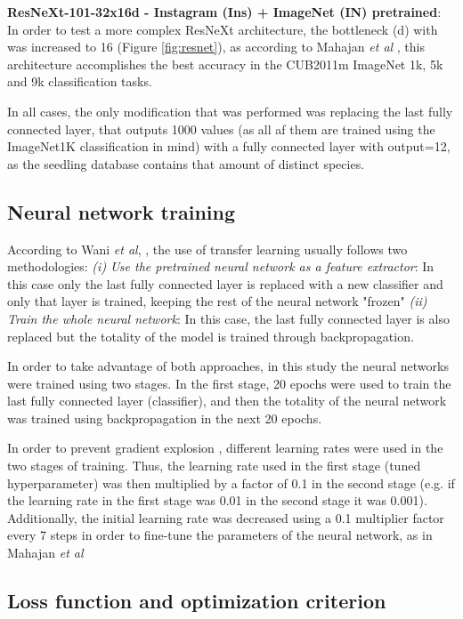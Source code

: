 \documentclass[10pt,onecolumn,titlepage,letterpaper]{article}
\begin{document}
\textbf{ResNeXt-101-32x16d - Instagram (Ins) + ImageNet (IN) pretrained}: In order to test a more complex ResNeXt architecture, the bottleneck (d) with was increased to 16 (Figure \ref{fig:resnet}), as according to Mahajan \textit{et al} \cite{Mahajan2018}, this architecture accomplishes the best accuracy in the CUB2011m ImageNet 1k, 5k and 9k classification tasks.

In all cases, the only modification that was performed was replacing the last fully connected layer, that outputs 1000 values (as all af them are trained using the ImageNet1K classification in mind) with a fully connected layer with output=12, as the seedling database contains that amount of distinct species.

\subsection{Neural network training}

According to Wani \textit{et al}, \cite{Wani2019}, the use of transfer learning usually follows two methodologies:  \textit{(i) Use the pretrained neural network as a feature extractor}: In this case only the last fully connected layer is replaced with a new classifier and only that layer is trained, keeping the rest of the neural network "frozen" \textit{(ii) Train the whole neural network}: In this case, the last fully connected layer is also replaced but the totality of the model is trained through backpropagation.

In order to take advantage of both approaches, in this study the neural networks were trained using two stages. In the first stage, 20 epochs were used to train the last fully connected layer (classifier), and then the totality of the neural network was trained using backpropagation in the next 20 epochs. 

In order to prevent gradient explosion \cite{Aghdam2017}, different learning rates were used in the two stages of training. Thus, the learning rate used in the first stage (tuned hyperparameter) was then multiplied by a factor of 0.1 in the second stage (e.g. if the learning rate in the first stage was 0.01 in the second stage it was 0.001). Additionally, the initial learning rate was decreased using a 0.1 multiplier factor every 7 steps in order to fine-tune the parameters of the neural network, as in Mahajan \textit{et al} \cite{Mahajan2018}


\subsection{Loss function and optimization criterion}
\end{document}
